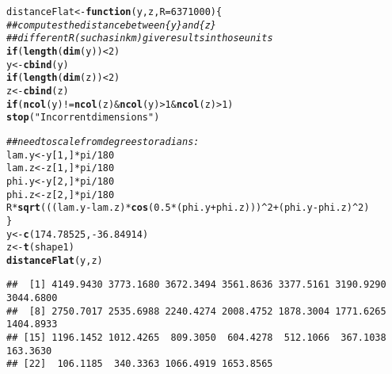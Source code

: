 \documentclass[11pt]{article}\usepackage[]{graphicx}\usepackage[]{color}
\makeatletter
\newcommand{\hlnum}[1]{\textcolor[rgb]{0.686,0.059,0.569}{#1}}%
\newcommand{\hlstr}[1]{\textcolor[rgb]{0.192,0.494,0.8}{#1}}%
\newcommand{\hlcom}[1]{\textcolor[rgb]{0.678,0.584,0.686}{\textit{#1}}}%
\newcommand{\hlopt}[1]{\textcolor[rgb]{0,0,0}{#1}}%
\newcommand{\hlstd}[1]{\textcolor[rgb]{0.345,0.345,0.345}{#1}}%
\newcommand{\hlkwa}[1]{\textcolor[rgb]{0.161,0.373,0.58}{\textbf{#1}}}%
\newcommand{\hlkwb}[1]{\textcolor[rgb]{0.69,0.353,0.396}{#1}}%
\newcommand{\hlkwc}[1]{\textcolor[rgb]{0.333,0.667,0.333}{#1}}%
\newcommand{\hlkwd}[1]{\textcolor[rgb]{0.737,0.353,0.396}{\textbf{#1}}}%
\newenvironment{kframe}{%
 \def\at@end@of@kframe{}%
 \ifinner\ifhmode%
  \def\at@end@of@kframe{\end{minipage}}%
  \begin{minipage}{\columnwidth}%
 \fi\fi%
 \def\FrameCommand##1{\hskip\@totalleftmargin \hskip-\fboxsep
 \colorbox{shadecolor}{##1}\hskip-\fboxsep
     \hskip-\linewidth \hskip-\@totalleftmargin \hskip\columnwidth}%
 \MakeFramed {\advance\hsize-\width
   \@totalleftmargin\z@ \linewidth\hsize
   \@setminipage}}%
 {\par\unskip\endMakeFramed%
 \at@end@of@kframe}
\newenvironment{knitrout}{}{} %
\makeatother
\begin{document}
\begin{knitrout}
\color{fgcolor}\begin{kframe}
\begin{alltt}
\hlstd{distanceFlat} \hlkwb{<-} \hlkwa{function}\hlstd{(}\hlkwc{y}\hlstd{,} \hlkwc{z}\hlstd{,} \hlkwc{R} \hlstd{=} \hlnum{6371000}\hlstd{) \{}
    \hlcom{## computes the distance between \{y\} and \{z\}}
    \hlcom{## different R (such as in km) give results in those units}
    \hlkwa{if} \hlstd{(}\hlkwd{length}\hlstd{(}\hlkwd{dim}\hlstd{(y))} \hlopt{<} \hlnum{2}\hlstd{)}
        \hlstd{y} \hlkwb{<-} \hlkwd{cbind}\hlstd{(y)}
    \hlkwa{if} \hlstd{(}\hlkwd{length}\hlstd{(}\hlkwd{dim}\hlstd{(z))} \hlopt{<} \hlnum{2}\hlstd{)}
        \hlstd{z} \hlkwb{<-} \hlkwd{cbind}\hlstd{(z)}
    \hlkwa{if} \hlstd{(}\hlkwd{ncol}\hlstd{(y)} \hlopt{!=} \hlkwd{ncol}\hlstd{(z)} \hlopt{&} \hlkwd{ncol}\hlstd{(y)} \hlopt{>} \hlnum{1} \hlopt{&} \hlkwd{ncol}\hlstd{(z)} \hlopt{>} \hlnum{1}\hlstd{)}
        \hlkwd{stop}\hlstd{(}\hlstr{"Incorrent dimensions"}\hlstd{)}

    \hlcom{## need to scale from degrees to radians:}
    \hlstd{lam.y} \hlkwb{<-} \hlstd{y[}\hlnum{1}\hlstd{, ]} \hlopt{*} \hlstd{pi} \hlopt{/} \hlnum{180}
    \hlstd{lam.z} \hlkwb{<-} \hlstd{z[}\hlnum{1}\hlstd{, ]} \hlopt{*} \hlstd{pi} \hlopt{/} \hlnum{180}
    \hlstd{phi.y} \hlkwb{<-} \hlstd{y[}\hlnum{2}\hlstd{, ]} \hlopt{*} \hlstd{pi} \hlopt{/} \hlnum{180}
    \hlstd{phi.z} \hlkwb{<-} \hlstd{z[}\hlnum{2}\hlstd{, ]} \hlopt{*} \hlstd{pi} \hlopt{/} \hlnum{180}
    \hlstd{R} \hlopt{*} \hlkwd{sqrt}\hlstd{(((lam.y} \hlopt{-} \hlstd{lam.z)} \hlopt{*} \hlkwd{cos}\hlstd{(}\hlnum{0.5} \hlopt{*} \hlstd{(phi.y} \hlopt{+} \hlstd{phi.z)))}\hlopt{^}\hlnum{2} \hlopt{+} \hlstd{(phi.y} \hlopt{-} \hlstd{phi.z)}\hlopt{^}\hlnum{2}\hlstd{)}
\hlstd{\}}
\hlstd{y} \hlkwb{<-} \hlkwd{c}\hlstd{(}\hlnum{174.78525}\hlstd{,} \hlopt{-}\hlnum{36.84914}\hlstd{)}
\hlstd{z} \hlkwb{<-} \hlkwd{t}\hlstd{(shape1)}
\hlkwd{distanceFlat}\hlstd{(y, z)}
\end{alltt}
\begin{verbatim}
##  [1] 4149.9430 3773.1680 3672.3494 3561.8636 3377.5161 3190.9290 3044.6800
##  [8] 2750.7017 2535.6988 2240.4274 2008.4752 1878.3004 1771.6265 1404.8933
## [15] 1196.1452 1012.4265  809.3050  604.4278  512.1066  367.1038  163.3630
## [22]  106.1185  340.3363 1066.4919 1653.8565
\end{verbatim}
\end{kframe}
\end{knitrout}
\end{document}
